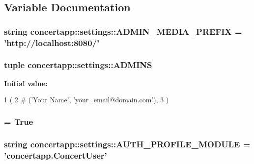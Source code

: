 \subsection{Variable Documentation}
\hypertarget{namespaceconcertapp_1_1settings_ac13404f3fddc64c7cb153abaefcf19ac}{
\subsubsection[{ADMIN\_\-MEDIA\_\-PREFIX}]{\setlength{\rightskip}{0pt plus 5cm}string {\bf concertapp::settings::ADMIN\_\-MEDIA\_\-PREFIX} = 'http://localhost:8080/'}}
\label{namespaceconcertapp_1_1settings_ac13404f3fddc64c7cb153abaefcf19ac}
\hypertarget{namespaceconcertapp_1_1settings_a8d3a4e4513fc897541b683017c482186}{
\subsubsection[{ADMINS}]{\setlength{\rightskip}{0pt plus 5cm}tuple {\bf concertapp::settings::ADMINS}}}
\label{namespaceconcertapp_1_1settings_a8d3a4e4513fc897541b683017c482186}
{\bfseries Initial value:}
\begin{DoxyCode}
1 (
2     # ('Your Name', 'your_email@domain.com'),
3 )
\end{DoxyCode}
\hypertarget{namespaceconcertapp_1_1settings_a17b818bd6ddd258a8bf3bc9d9f29ae6e}{
\subsubsection[{APPEND\_\-SLASH}]{ = True}}
\label{namespaceconcertapp_1_1settings_a17b818bd6ddd258a8bf3bc9d9f29ae6e}
\hypertarget{namespaceconcertapp_1_1settings_a8c1ac824cf01b178c085f46a12a0b747}{
\subsubsection[{AUTH\_\-PROFILE\_\-MODULE}]{\setlength{\rightskip}{0pt plus 5cm}string {\bf concertapp::settings::AUTH\_\-PROFILE\_\-MODULE} = 'concertapp.ConcertUser'}}
